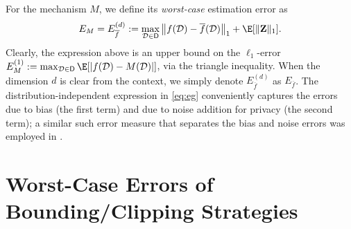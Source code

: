 \documentclass[conference,letterpaper]{IEEEtran}
\theoremstyle{remark}
\theoremstyle{definition}
\begin{document}

For the mechanism $M$, we define its \emph{worst-case} estimation error as
\begin{equation}
	\label{eq:eg}
	E_M = E_{\overline{f}}^{(d)}:= \max_{\mathcal{D}\in \mathsf{D}} \big \lVert f(\mathcal{D}) - \overline{f}(\mathcal{D}) \big\rVert_1 + \E[\lVert{\mathbf{Z}}\rVert_1].
\end{equation}
Clearly, the expression above is an upper bound on the $\ell_1$-error $E^{(1)}_M:= \max_{\mathcal{D}\in \mathsf{D}} \E[|f(\mathcal{D})-M(\mathcal{D})|]$, via the triangle inequality. When the dimension $d$ is clear from the context, we simply denote $E_{\overline{f}}^{(d)}$ as $E_{\overline{f}}$. The distribution-independent expression in \eqref{eq:eg} conveniently captures the errors due to bias (the first term) and due to noise addition for privacy (the second term); a similar such error measure that separates the bias and noise errors was employed in \cite{amin}. 
\section{Worst-Case Errors of Bounding/Clipping Strategies}
\label{sec:bound}
\end{document}
